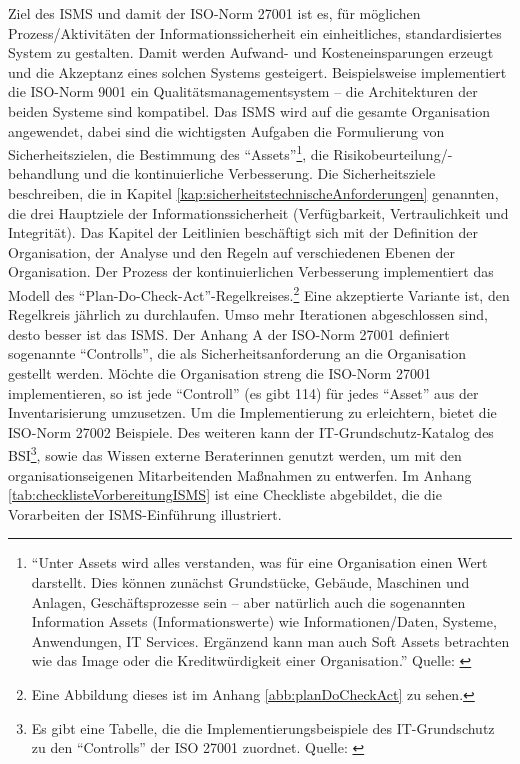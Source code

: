 Ziel des \ac{ISMS} und damit der ISO-Norm 27001 ist es, für möglichen Prozess/Aktivitäten der Informationssicherheit ein einheitliches, standardisiertes System zu gestalten. Damit werden Aufwand- und Kosteneinsparungen erzeugt und die Akzeptanz eines solchen Systems gesteigert. Beispielsweise implementiert die ISO-Norm 9001 ein Qualitätsmanagementsystem\autocite{dindeutsches_institut_fur_normung_qualitatsmanagementsysteme_2020} -- die Architekturen der beiden Systeme sind kompatibel. Das \ac{ISMS} wird auf die gesamte Organisation angewendet, dabei sind die wichtigsten Aufgaben die Formulierung von Sicherheitszielen, die Bestimmung des \enquote{Assets}\footnote{\enquote{Unter Assets wird alles verstanden, was für eine Organisation einen Wert darstellt. Dies können zunächst Grundstücke, Gebäude, Maschinen und Anlagen, Geschäftsprozesse sein – aber natürlich auch die sogenannten Information Assets (Informationswerte) wie Informationen/Daten, Systeme, Anwendungen, IT Services. Ergänzend kann man auch Soft Assets betrachten wie das Image oder die Kreditwürdigkeit einer Organisation.} Quelle: \cite[][S.8]{kersten_it-sicherheitsmanagement_2020}}, die Risikobeurteilung/-behandlung und die kontinuierliche Verbesserung. Die Sicherheitsziele beschreiben, die in Kapitel \vref{kap:sicherheitstechnischeAnforderungen} genannten, die drei Hauptziele der Informationssicherheit (Verfügbarkeit, Vertraulichkeit und Integrität). Das Kapitel der Leitlinien beschäftigt sich mit der Definition der Organisation, der Analyse und den Regeln auf verschiedenen Ebenen der Organisation. Der Prozess der kontinuierlichen Verbesserung implementiert das Modell des \enquote{Plan-Do-Check-Act}-Regelkreises.\footnote{Eine Abbildung dieses ist im Anhang \vref{abb:planDoCheckAct} zu sehen.} Eine akzeptierte Variante ist, den Regelkreis jährlich zu durchlaufen. Umso mehr Iterationen abgeschlossen sind, desto besser ist das \ac{ISMS}.\autocite[vgl.][S.16]{dindeutsches_institut_fur_normung_informationstechnik_2020} Der Anhang A der ISO-Norm 27001 definiert sogenannte \enquote{Controlls}, die als Sicherheitsanforderung an die Organisation gestellt werden. Möchte die Organisation streng die ISO-Norm 27001 implementieren, so ist jede \enquote{Controll} (es gibt 114) für jedes \enquote{Asset} aus der Inventarisierung umzusetzen. Um die Implementierung zu erleichtern, bietet die ISO-Norm 27002\autocite[vgl.][]{deutsches_institut_fur_normung_ev_informationstechnik_2017} Beispiele. Des weiteren kann der IT-Grundschutz-Katalog des \ac{BSI}\footnote{Es gibt eine Tabelle, die die Implementierungsbeispiele des IT-Grundschutz zu den  \enquote{Controlls} der ISO 27001 zuordnet. Quelle: \cite[][]{bundesamt_fur_sicherheit_in_der_informationstechnik_bsi_zuordnungstabelle_2018}}, sowie das Wissen externe Beraterinnen genutzt werden, um mit den organisationseigenen Mitarbeitenden Maßnahmen zu entwerfen. Im Anhang \vref{tab:checklisteVorbereitungISMS} ist eine Checkliste abgebildet, die die Vorarbeiten der \ac{ISMS}-Einführung illustriert.
 
